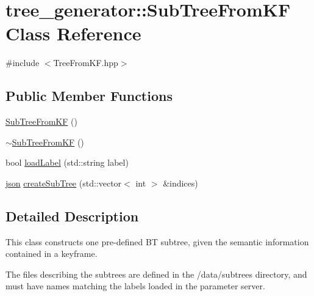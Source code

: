 \hypertarget{classtree__generator_1_1SubTreeFromKF}{\section{tree\-\_\-generator\-:\-:Sub\-Tree\-From\-K\-F Class Reference}
\label{classtree__generator_1_1SubTreeFromKF}
}


{\ttfamily \#include $<$Tree\-From\-K\-F.\-hpp$>$}

\subsection*{Public Member Functions}
\begin{DoxyCompactItemize}
\item 
\hyperlink{classtree__generator_1_1SubTreeFromKF_ab7af1f33766b79ffb8d596db12a567f4}{Sub\-Tree\-From\-K\-F} ()
\item 
\hyperlink{classtree__generator_1_1SubTreeFromKF_aa6f44a5c131577ea1719a3fa3a28d65d}{$\sim$\-Sub\-Tree\-From\-K\-F} ()
\item 
bool \hyperlink{classtree__generator_1_1SubTreeFromKF_a3e4e089333af3305e40434e49dcc0878}{load\-Label} (std\-::string label)
\item 
\hyperlink{parse__tree_8h_ab701e3ac61a85b337ec5c1abaad6742d}{json} \hyperlink{classtree__generator_1_1SubTreeFromKF_a531cc034d2af6a380a40763894542760}{create\-Sub\-Tree} (std\-::vector$<$ int $>$ \&indices)
\end{DoxyCompactItemize}


\subsection{Detailed Description}
This class constructs one pre-\/defined B\-T subtree, given the semantic information contained in a keyframe.

The files describing the subtrees are defined in the /data/subtrees directory, and must have names matching the labels loaded in the parameter server. 

